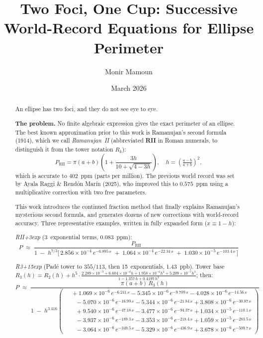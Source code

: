 \documentclass[12pt]{article}
\title{Two Foci, One Cup: Successive World-Record Equations for Ellipse Perimeter}
\author{Monir Mamoun}
\date{March 2026}
\begin{document}
\maketitle

\begin{abstract}

An ellipse has two foci, and they do not see eye to eye.

\medskip
\noindent\textbf{The problem.}
No finite algebraic expression gives the exact perimeter of an ellipse.  The best known approximation prior to this work is Ramanujan's second formula (1914), which we call \emph{Ramanujan~II} (abbreviated \textbf{RII} in Roman numerals, to distinguish it from the tower notation $R_k$):
\[
P_{\text{RII}} = \pi(a{+}b)\!\left(1 + \frac{3h}{10+\sqrt{4-3h}}\right), \quad h = \left(\tfrac{a-b}{a+b}\right)^{\!2},
\]
which is accurate to $402$~ppm (parts per million).  The previous world record was set by Ayala Raggi \& Rend\'on Mar\'in (2025), who improved this to $0.575$~ppm using a multiplicative correction with two free parameters.

This work introduces the continued fraction method that finally explains Ramanujan's mysterious second formula, and generates dozens of new corrections with world-record accuracy.  Three representative examples, written in fully expanded form ($x \equiv 1{-}h$):

\smallskip\noindent\emph{RII+3exp} (3~exponential terms, 0.083~ppm):
\[
P \;\approx\; \frac{P_{\text{RII}}}{1 \;-\; h^{7/3}\!\bigl[\,
  2.856{\times}10^{-4}\,e^{-6.895\,x}
  \;+\; 1.064{\times}10^{-4}\,e^{-22.34\,x}
  \;+\; 1.030{\times}10^{-5}\,e^{-103.4\,x}\,\bigr]}
\]

\smallskip\noindent\emph{R3+15exp} (Pad\'e tower to $355/113$, then 15~exponentials, 1.43~ppb).
Tower base $R_3(h) = R_2(h) + h^5\!\cdot\!\frac{2.289{\times}10^{-5} + 6.604{\times}10^{-6}h + 1.958{\times}10^{-6}h^2 + 5.209{\times}10^{-7}h^3}{1 - 1.357\,h + 0.4197\,h^2}$; then:
\begin{equation*}
P \;\approx\; \frac{\pi(a{+}b)\,R_3(h)}{1 \;-\; h^{3.416}\!\left(\!\begin{aligned}
  &\; +1.069{\times}10^{-6}\,e^{-6.241\,x}
     -5.345{\times}10^{-6}\,e^{-9.709\,x}
     -4.028{\times}10^{-6}\,e^{-14.56\,x} \\[-3pt]
  &\quad -5.070{\times}10^{-6}\,e^{-16.99\,x}
     -5.344{\times}10^{-6}\,e^{-21.84\,x}
     +3.808{\times}10^{-6}\,e^{-30.87\,x} \\[-3pt]
  &\quad +9.540{\times}10^{-6}\,e^{-47.18\,x}
     -3.477{\times}10^{-6}\,e^{-94.37\,x}
     +1.034{\times}10^{-5}\,e^{-110.1\,x} \\[-3pt]
  &\quad -3.937{\times}10^{-6}\,e^{-189.3\,x}
     -3.353{\times}10^{-6}\,e^{-218.4\,x}
     +1.059{\times}10^{-5}\,e^{-283.5\,x} \\[-3pt]
  &\quad -3.064{\times}10^{-6}\,e^{-349.5\,x}
     -5.329{\times}10^{-6}\,e^{-436.9\,x}
     +3.678{\times}10^{-6}\,e^{-509.7\,x}
\end{aligned}\!\right)}
\end{equation*}


\end{abstract}
\end{document}
